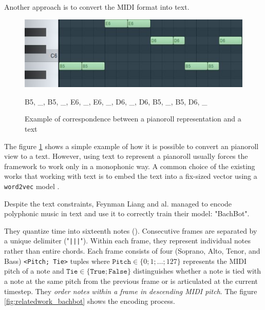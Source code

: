 \documentclass[12pt]{report}
\begin{document}
Another approach is to convert the MIDI format into text. \cite{hadjeres_deepbach:_2016}

\begin{figure}[H]
   \begin{minipage}{0.5\textwidth}
     \centering
     \includegraphics[width=.9\linewidth]{images/music/pianoroll/pianoroll_small_2.jpg}
   \end{minipage}\hfill
   \begin{minipage}{0.5\textwidth}
     \centering
     B5, \_, B5, \_, E6, \_, E6, \_, D6, \_, D6, B5, \_, B5, D6, \_ 
   \end{minipage}
 \caption{Example of correspondence between a pianoroll representation and a text}
 \label{fig:pianoroll_to_text}
\end{figure}

The figure \ref{fig:pianoroll_to_text} shows a simple example of how it is possible to convert an pianoroll view to a text.
However, using text to represent a pianoroll usually forces the framework to work only in a monophonic way.
A common choice of the existing works that working with text is to embed the text into a fix-sized vector using a \texttt{word2vec} \cite{goldberg_word2vec_2014, karani_introduction_2018, rong_word2vec_2016, noauthor_beginners_nodate, mikolov_distributed_2013} model \cite{liang_automatic_2017, herremans_modeling_2017}.

\bigskip

Despite the text constraints, Feynman Liang and al. \cite{liang_automatic_2017} managed to encode polyphonic music in text and use it to correctly train their model: "BachBot".

They quantize time into sixteenth notes (\musEighth). Consecutive frames are separated by a unique delimiter ("\texttt{|||}").
Within each frame, they represent individual notes rather than entire chords.
Each frame consists of four (Soprano, Alto, Tenor, and Bass) \texttt{<Pitch; Tie>} tuples where $\texttt{Pitch} \in \{0; 1; \dots ; 127\}$ represents the MIDI pitch of a note and $\texttt{Tie} \in \{\texttt{True}; \texttt{False}\}$ distinguishes whether a note is tied with a note at the same pitch from the
previous frame or is articulated at the current timestep.
They \textit{order notes within a frame in descending MIDI pitch}.
The figure \ref{fig:relatedwork_bachbot} shows the encoding process.
\end{document}
